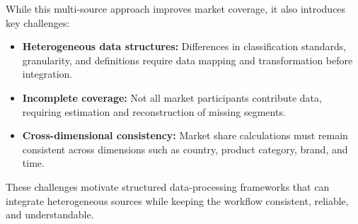 While this multi-source approach improves market coverage, it also introduces key challenges:

\begin{itemize}
    \item \textbf{Heterogeneous data structures:} Differences in classification standards, granularity, and definitions require data mapping and transformation before integration.

    \item \textbf{Incomplete coverage:} Not all market participants contribute data, requiring estimation and reconstruction of missing segments.

    \item \textbf{Cross-dimensional consistency:} Market share calculations must remain consistent across dimensions such as country, product category, brand, and time.
\end{itemize}

These challenges motivate structured data-processing frameworks that can integrate heterogeneous sources while keeping the workflow consistent, reliable, and understandable.






















